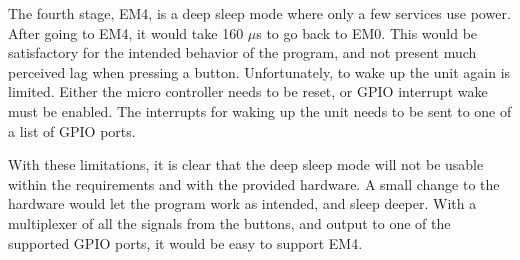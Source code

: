 The fourth stage, EM4, is a deep sleep mode where only a few services use power.
After going to EM4, it would take 160 $\mu$s to go back to EM0.
This would be satisfactory for the intended behavior of the program, and not present much perceived lag when pressing a button.
Unfortunately, to wake up the unit again is limited.
Either the micro controller needs to be reset, or GPIO interrupt wake must be enabled.
The interrupts for waking up the unit needs to be sent to one of a list of GPIO ports.\cite{referencemanual}

With these limitations, it is clear that the deep sleep mode will not be usable within the requirements and with the provided hardware.
A small change to the hardware would let the program work as intended, and sleep deeper.
With a multiplexer of all the signals from the buttons, and output to one of the supported GPIO ports, it would be easy to support EM4.
